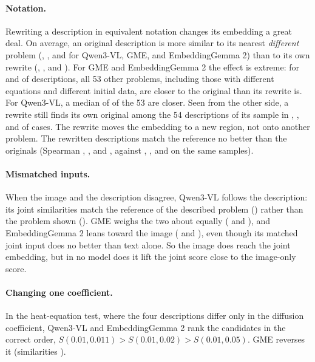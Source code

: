 \paragraph{Notation.}
Rewriting a description in equivalent notation changes its embedding a great deal. On average, an original description is more similar to its nearest \emph{different} problem (\notOtherQw{}, \notOtherGme{}, and \notOtherGem{} for Qwen3-VL, GME, and EmbeddingGemma 2) than to its own rewrite (\notSelfQw{}, \notSelfGme{}, and \notSelfGem{}). For GME and EmbeddingGemma 2 the effect is extreme: for \notAllGme{} and \notAllGem{} of descriptions, all 53 other problems, including those with different equations and different initial data, are closer to the original than its rewrite is. For Qwen3-VL, a median of \notCloserQw{} of the 53 are closer. Seen from the other side, a rewrite still finds its own original among the 54 descriptions of its sample in \notTopQw{}, \notTopGme{}, and \notTopGem{} of cases. The rewrite moves the embedding to a new region, not onto another problem. The rewritten descriptions match the reference no better than the originals (Spearman \notSpQw{}, \notSpGme{}, and \notSpGem{}, against \notSpOrigQw{}, \notSpOrigGme{}, and \notSpOrigGem{} on the same samples).

\paragraph{Mismatched inputs.}
When the image and the description disagree, Qwen3-VL follows the description: its joint similarities match the reference of the described problem (\misDeckQw{}) rather than the problem shown (\misImgQw{}). GME weighs the two about equally (\misDeckGme{} and \misImgGme{}), and EmbeddingGemma 2 leans toward the image (\misDeckGem{} and \misImgGem{}), even though its matched joint input does no better than text alone. So the image does reach the joint embedding, but in no model does it lift the joint score close to the image-only score.

\paragraph{Changing one coefficient.}
In the heat-equation test, where the four descriptions differ only in the diffusion coefficient, Qwen3-VL and EmbeddingGemma 2 rank the candidates in the correct order, $S(0.01,0.011)>S(0.01,0.02)>S(0.01,0.05)$. GME reverses it (similarities \heatValsGme{}).



